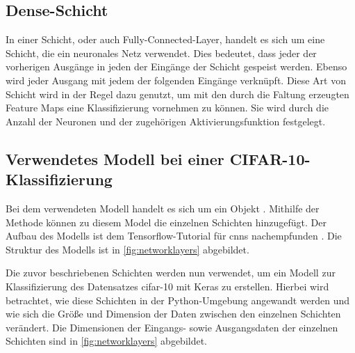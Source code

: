 \subsection{Dense-Schicht}\label{subsec:dense}

In einer Schicht, oder auch Fully-Connected-Layer, handelt es sich um eine Schicht, die ein neuronales Netz verwendet. Dies bedeutet, dass jeder der vorherigen Ausgänge in jeden der Eingänge der Schicht gespeist werden. Ebenso wird jeder Ausgang mit jedem der folgenden Eingänge verknüpft. Diese Art von Schicht wird in der Regel dazu genutzt, um mit den durch die Faltung erzeugten Feature Maps eine Klassifizierung vornehmen zu können.  \cite{Keras:2020b} Sie wird durch die Anzahl der Neuronen und der zugehörigen Aktivierungsfunktion festgelegt.



\subsection{Verwendetes Modell bei einer CIFAR-10-Klassifizierung}\label{sec:usedmodel}

Bei dem verwendeten Modell handelt es sich um ein Objekt . Mithilfe der Methode  können zu diesem Model die einzelnen Schichten   hinzugefügt. Der Aufbau des Modells ist dem Tensorflow-Tutorial für \acp{cnn} nachempfunden \cite{GoogleTensorFlowCNN:2020}. Die Struktur des Modells ist in \cref{fig:networklayers} abgebildet.

Die zuvor beschriebenen Schichten werden nun verwendet, um ein Modell zur Klassifizierung des  Datensatzes \ac{cifar}-10 mit Keras zu erstellen. Hierbei wird betrachtet, wie diese Schichten in der Python-Umgebung angewandt werden und wie sich die Größe und Dimension der Daten zwischen den einzelnen Schichten verändert. Die Dimensionen der Eingangs- sowie Ausgangsdaten der einzelnen Schichten sind in \cref{fig:networklayers} abgebildet.



